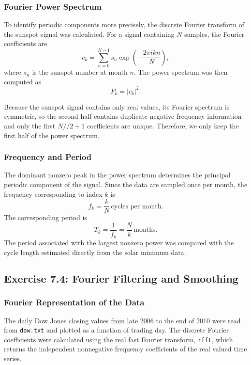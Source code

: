 \documentclass[a4paper,11pt]{article}
\begin{document}
\subsubsection*{Fourier Power Spectrum}

To identify periodic components more precisely, the discrete Fourier transform of the sunspot signal was calculated. For a signal containing $N$ samples, the Fourier coefficients are
\[ c_k = \sum_{n=0}^{N-1} s_n \exp\left(-\frac{2\pi i kn}{N}\right),\] where $s_n$ is the sunspot number at month $n$. The power spectrum was then computed as \[P_k = |c_k|^2.\]

Because the sunspot signal contains only real values, its Fourier spectrum is symmetric, so the second half contains duplicate negative frequency information and only the first \(N//2+1\) coefficients are unique. Therefore, we only keep the first half of the power spectrum.

\subsubsection*{Frequency and Period}

The dominant nonzero peak in the power spectrum determines the principal periodic component of the signal. Since the data are sampled once per month, the frequency corresponding to index $k$ is
\[f_k = \frac{k}{N} \, \text{cycles per month}. \] The corresponding period is \[T_k = \frac{1}{f_k} = \frac{N}{k} \, \text{months}.\]
The period associated with the largest nonzero power was compared with the cycle length estimated directly from the solar minimum data.

\subsection*{Exercise 7.4: Fourier Filtering and Smoothing}

\subsubsection*{Fourier Representation of the Data}

The daily Dow Jones closing values from late 2006 to the end of 2010 were read from \texttt{dow.txt} and plotted as a function of trading day. The discrete Fourier coefficients were calculated using the real fast Fourier transform, \texttt{rfft}, which returns the independent nonnegative frequency coefficients of the real valued time series.
\end{document}
